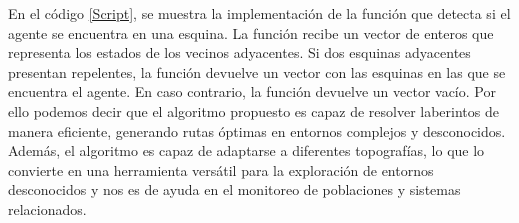         En el c\'odigo \ref{Script}, se muestra la implementaci\'on de la funci\'on que detecta si el agente se encuentra en una esquina. 
            La funci\'on recibe un vector de enteros que representa los estados de los vecinos adyacentes. Si dos esquinas adyacentes 
            presentan repelentes, la funci\'on devuelve un vector con las esquinas en las que se encuentra el agente. 
            En caso contrario, la funci\'on devuelve un vector vac\'io.
        \vskip 0.5cm
        Por ello podemos decir que el algoritmo propuesto es capaz de resolver laberintos de manera eficiente, 
            generando rutas \'optimas en entornos complejos y desconocidos. Adem\'as, el algoritmo es capaz de 
            adaptarse a diferentes topograf\'ias, lo que lo convierte en una herramienta vers\'atil para la exploraci\'on 
            de entornos desconocidos y nos es de ayuda en el monitoreo de poblaciones y sistemas relacionados.
        \vskip 0.5cm
        
        
        
        
        
        
        
